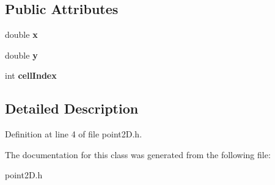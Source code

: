 \subsection*{Public Attributes}
\begin{DoxyCompactItemize}
\item 
\mbox{\label{classpoint2D_ade69032d2a9596dfd5c2b3ee29551569}} 
double {\bfseries x}
\item 
\mbox{\label{classpoint2D_aeb2d0d7a7919611c9b6022fec6ca0bc6}} 
double {\bfseries y}
\item 
\mbox{\label{classpoint2D_ac6fadd42bce37bf8d54665b350246768}} 
int {\bfseries cell\+Index}
\end{DoxyCompactItemize}


\subsection{Detailed Description}


Definition at line 4 of file point2\+D.\+h.



The documentation for this class was generated from the following file\+:\begin{DoxyCompactItemize}
\item 
point2\+D.\+h\end{DoxyCompactItemize}

